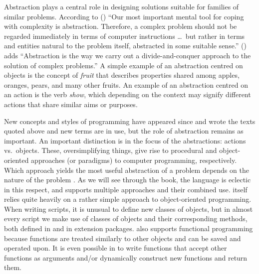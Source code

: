 \documentclass[krantz2]{krantz}\usepackage{knitr}
\begin{document}
Abstraction plays a central role in designing solutions suitable for families of similar problems. According to \citeauthor{Wirth1974} (\citeyear{Wirth1974}) ``Our most important mental tool for coping with complexity is abstraction. Therefore, a complex problem should not be regarded
immediately in terms of computer instructions \ldots\ but rather in terms and entities natural to the problem itself, abstracted in some suitable sense.'' \citeauthor{Zimmer1985} (\citeyear{Zimmer1985}) adds ``Abstraction is the way we carry out a divide-and-conquer approach to the solution of complex problems.'' A simple example of an abstraction centred on objects is the concept of \emph{fruit} that describes properties shared among apples, oranges, pears, and many other fruits. An example of an abstraction centred on an action is the verb \emph{show}, which depending on the context may signify different actions that share similar aims or purposes.

\begin{explainbox}
New concepts and styles of programming have appeared since \citeauthor{Wirth1974} and \citeauthor{Zimmer1985} wrote the texts quoted above and new terms are in use, but the role of abstraction remains as important. An important distinction is in the focus of the abstractions: actions vs.\ objects. These, oversimplifying things, give rise to procedural and object-oriented approaches (or paradigms) to computer programming, respectively. Which approach yields the most useful abstraction of a problem depends on the nature of the problem \autocite[see][]{Coplien1999}. As we will see through the book, the \Rlang language is eclectic in this respect, and supports multiple approaches and their combined use. \Rlang itself relies quite heavily on a rather simple approach to object-oriented programming. When writing scripts, it is unusual to define new classes of objects, but in almost every script we make use of classes of objects and their corresponding methods, both defined in \Rlang and in extension packages. \Rlang also supports functional programming because functions are treated similarly to other objects and can be saved and operated upon. It is even possible in \Rlang to write functions that accept other functions as arguments and/or dynamically construct new functions and return them.
\end{explainbox}
\end{document}
